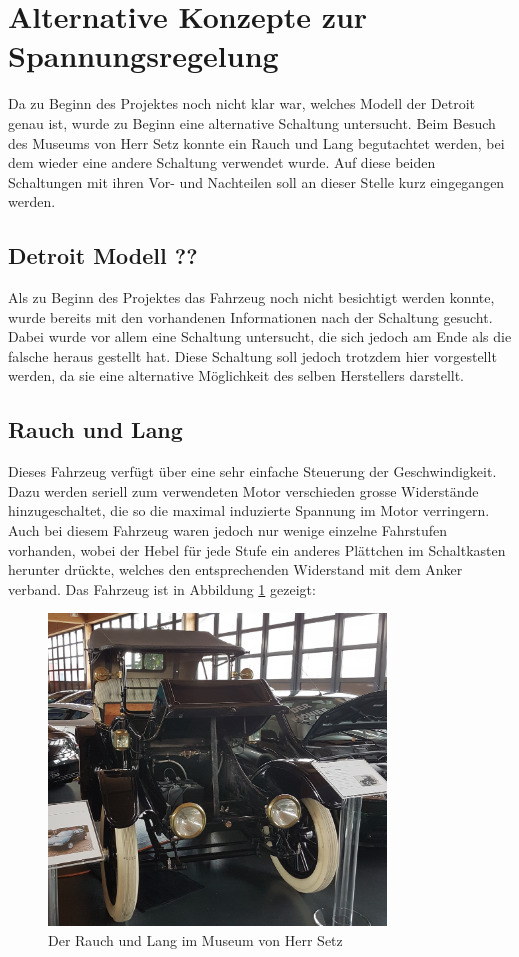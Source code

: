 \section{Alternative Konzepte zur Spannungsregelung}
Da zu Beginn des Projektes noch nicht klar war, welches Modell der Detroit genau ist, wurde zu Beginn eine alternative Schaltung untersucht. Beim Besuch des Museums von Herr Setz konnte ein Rauch und Lang begutachtet werden, bei dem wieder eine andere Schaltung verwendet wurde. Auf diese beiden Schaltungen mit ihren Vor- und Nachteilen soll an dieser Stelle kurz eingegangen werden.

\subsection{Detroit Modell ??}
Als zu Beginn des Projektes das Fahrzeug noch nicht besichtigt werden konnte, wurde bereits mit den vorhandenen Informationen nach der Schaltung gesucht. Dabei wurde vor allem eine Schaltung untersucht, die sich jedoch am Ende als die falsche heraus gestellt hat. Diese Schaltung soll jedoch trotzdem hier vorgestellt werden, da sie eine alternative Möglichkeit des selben Herstellers darstellt.

\subsection{Rauch und Lang}
Dieses Fahrzeug verfügt über eine sehr einfache Steuerung der Geschwindigkeit. Dazu werden seriell zum verwendeten Motor verschieden grosse Widerstände hinzugeschaltet, die so die maximal induzierte Spannung im Motor verringern. Auch bei diesem Fahrzeug waren jedoch nur wenige einzelne Fahrstufen vorhanden, wobei der Hebel für jede Stufe ein anderes Plättchen im Schaltkasten herunter drückte, welches den entsprechenden Widerstand mit dem Anker verband. Das Fahrzeug ist in Abbildung \ref{fig:Setz} gezeigt:

\begin{figure}[h]
	\centering
		\includegraphics[width=0.8\textwidth]{images/Setz.JPG}
	\caption{Der Rauch und Lang im Museum von Herr Setz}
	\label{fig:Setz}
\end{figure}

